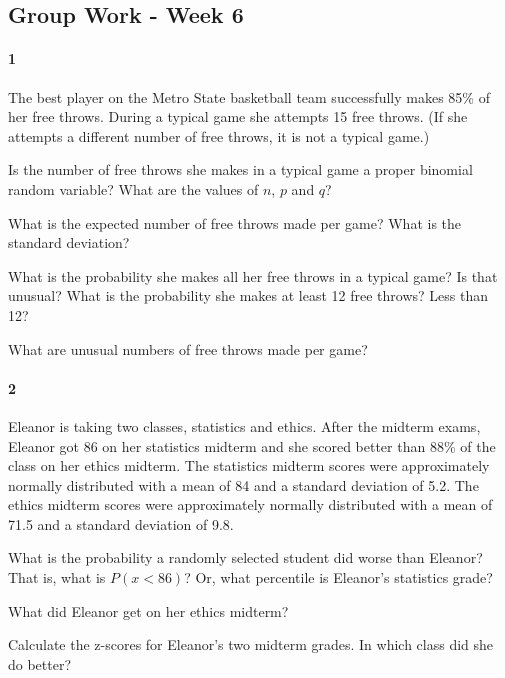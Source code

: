 \documentclass{article}
\begin{document}
\begin{flushleft}
\section*{Group Work - Week 6}
\paragraph{1} The best player on the Metro State basketball team successfully makes 85\% of her free throws. During a typical game she attempts 15 free throws. (If she attempts a different number of free throws, it is not a typical game.)
\begin{enumalpha}
\item Is the number of free throws she makes in a typical game a proper binomial random variable? What are the values of $n$, $p$ and $q$?

\vspace{1.8in}
\item What is the expected number of free throws made per game? What is the standard deviation?

\vspace{1.8in}
\item What is the probability she makes all her free throws in a typical game? Is that unusual? What is the probability she makes at least 12 free throws? Less than 12?

\vspace{1.8in}
\item What are unusual numbers of free throws made per game?
\end{enumalpha}

\newpage

\paragraph{2} Eleanor is taking two classes, statistics and ethics. After the midterm exams, Eleanor got 86 on her statistics midterm and she scored better than 88\% of the class on her ethics midterm. The statistics midterm scores were approximately normally distributed with a mean of 84 and a standard deviation of 5.2. The ethics midterm scores were approximately normally distributed with a mean of 71.5 and a standard deviation of 9.8. 

\begin{enumalpha}
\item What is the probability a randomly selected student did worse than Eleanor? That is, what is $P(x < 86)$? Or, what percentile is Eleanor's statistics grade?

\vspace{2in}
\item What did Eleanor get on her ethics midterm? 

\vspace{2in}
\item Calculate the z-scores for Eleanor's two midterm grades. In which class did she do better?
\end{enumalpha}

\end{flushleft}
\end{document}
